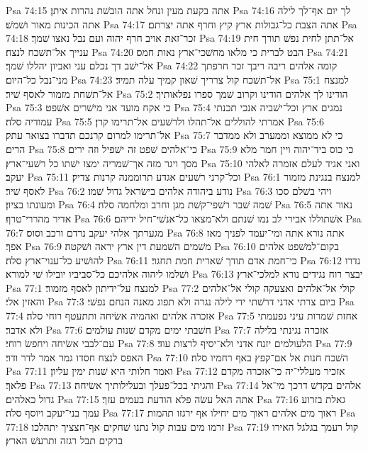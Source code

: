 Psa 74:15  אתה בקעת מעין ונחל אתה הובשׁת נהרות איתן׃
Psa 74:16  לך יום אף־לך לילה אתה הכינות מאור ושׁמשׁ׃
Psa 74:17  אתה הצבת כל־גבולות ארץ קיץ וחרף אתה יצרתם׃
Psa 74:18  זכר־זאת אויב חרף יהוה ועם נבל נאצו שׁמך׃
Psa 74:19  אל־תתן לחית נפשׁ תורך חית ענייך אל־תשׁכח לנצח׃
Psa 74:20  הבט לברית כי מלאו מחשׁכי־ארץ נאות חמס׃
Psa 74:21  אל־ישׁב דך נכלם עני ואביון יהללו שׁמך׃
Psa 74:22  קומה אלהים ריבה ריבך זכר חרפתך מני־נבל כל־היום׃
Psa 74:23  אל־תשׁכח קול צרריך שׁאון קמיך עלה תמיד׃
Psa 75:1  למנצח אל־תשׁחת מזמור לאסף שׁיר׃
Psa 75:2  הודינו לך אלהים הודינו וקרוב שׁמך ספרו נפלאותיך׃
Psa 75:3  כי אקח מועד אני מישׁרים אשׁפט׃
Psa 75:4  נמגים ארץ וכל־ישׁביה אנכי תכנתי עמודיה סלה׃
Psa 75:5  אמרתי להוללים אל־תהלו ולרשׁעים אל־תרימו קרן׃
Psa 75:6  אל־תרימו למרום קרנכם תדברו בצואר עתק׃
Psa 75:7  כי לא ממוצא וממערב ולא ממדבר הרים׃
Psa 75:8  כי־אלהים שׁפט זה ישׁפיל וזה ירים׃
Psa 75:9  כי כוס ביד־יהוה ויין חמר מלא מסך ויגר מזה אך־שׁמריה ימצו ישׁתו כל רשׁעי־ארץ׃
Psa 75:10  ואני אגיד לעלם אזמרה לאלהי יעקב׃
Psa 75:11  וכל־קרני רשׁעים אגדע תרוממנה קרנות צדיק׃
Psa 76:1  למנצח בנגינת מזמור לאסף שׁיר׃
Psa 76:2  נודע ביהודה אלהים בישׂראל גדול שׁמו׃
Psa 76:3  ויהי בשׁלם סכו ומעונתו בציון׃
Psa 76:4  שׁמה שׁבר רשׁפי־קשׁת מגן וחרב ומלחמה סלה׃
Psa 76:5  נאור אתה אדיר מהררי־טרף׃
Psa 76:6  אשׁתוללו אבירי לב נמו שׁנתם ולא־מצאו כל־אנשׁי־חיל ידיהם׃
Psa 76:7  מגערתך אלהי יעקב נרדם ורכב וסוס׃
Psa 76:8  אתה נורא אתה ומי־יעמד לפניך מאז אפך׃
Psa 76:9  משׁמים השׁמעת דין ארץ יראה ושׁקטה׃
Psa 76:10  בקום־למשׁפט אלהים להושׁיע כל־ענוי־ארץ סלה׃
Psa 76:11  כי־חמת אדם תודך שׁארית חמת תחגר׃
Psa 76:12  נדרו ושׁלמו ליהוה אלהיכם כל־סביביו יובילו שׁי למורא׃
Psa 76:13  יבצר רוח נגידים נורא למלכי־ארץ׃
Psa 77:1  למנצח על־ידיתון לאסף מזמור׃
Psa 77:2  קולי אל־אלהים ואצעקה קולי אל־אלהים והאזין אלי׃
Psa 77:3  ביום צרתי אדני דרשׁתי ידי לילה נגרה ולא תפוג מאנה הנחם נפשׁי׃
Psa 77:4  אזכרה אלהים ואהמיה אשׂיחה ותתעטף רוחי סלה׃
Psa 77:5  אחזת שׁמרות עיני נפעמתי ולא אדבר׃
Psa 77:6  חשׁבתי ימים מקדם שׁנות עולמים׃
Psa 77:7  אזכרה נגינתי בלילה עם־לבבי אשׂיחה ויחפשׂ רוחי׃
Psa 77:8  הלעולמים יזנח אדני ולא־יסיף לרצות עוד׃
Psa 77:9  האפס לנצח חסדו גמר אמר לדר ודר׃
Psa 77:10  השׁכח חנות אל אם־קפץ באף רחמיו סלה׃
Psa 77:11  ואמר חלותי היא שׁנות ימין עליון׃
Psa 77:12  אזכיר מעללי־יה כי־אזכרה מקדם פלאך׃
Psa 77:13  והגיתי בכל־פעלך ובעלילותיך אשׂיחה׃
Psa 77:14  אלהים בקדשׁ דרכך מי־אל גדול כאלהים׃
Psa 77:15  אתה האל עשׂה פלא הודעת בעמים עזך׃
Psa 77:16  גאלת בזרוע עמך בני־יעקב ויוסף סלה׃
Psa 77:17  ראוך מים אלהים ראוך מים יחילו אף ירגזו תהמות׃
Psa 77:18  זרמו מים עבות קול נתנו שׁחקים אף־חצציך יתהלכו׃
Psa 77:19  קול רעמך בגלגל האירו ברקים תבל רגזה ותרעשׁ הארץ׃
